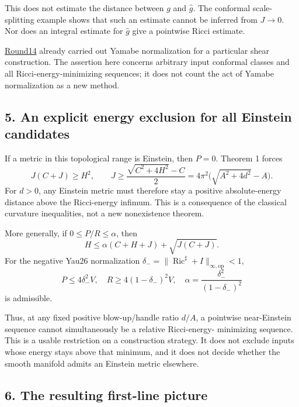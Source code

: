 \documentclass[
  11pt,
]{article}
\begin{document}
This does not estimate the distance between \(g\) and \(\widehat g\).
The conformal scale-splitting example shows that such an estimate cannot
be inferred from \(J\to0\). Nor does an integral estimate for
\(\widehat g\) give a pointwise Ricci estimate.

\href{round14_global.md}{Round14} already carried out Yamabe
normalization for a particular shear construction. The assertion here
concerns arbitrary input conformal classes and all
Ricci-energy-minimizing sequences; it does not count the act of Yamabe
normalization as a new method.

\hypertarget{an-explicit-energy-exclusion-for-all-einstein-candidates}{%
\subsection{5. An explicit energy exclusion for all Einstein
candidates}\label{an-explicit-energy-exclusion-for-all-einstein-candidates}}

If a metric in this topological range is Einstein, then \(P=0\). Theorem
1 forces \[
 J(C+J)\ge H^2,\qquad
 \boxed{
 J\ge\frac{\sqrt{C^2+4H^2}-C}{2}
   =4\pi^2\bigl(\sqrt{A^2+4d^2}-A\bigr).}
 \tag{30}
\] For \(d>0\), any Einstein metric must therefore stay a positive
absolute-energy distance above the Ricci-energy infimum. This is a
consequence of the classical curvature inequalities, not a new
nonexistence theorem.

More generally, if \(0\le P/R\le\alpha\), then \[
 H\le\alpha(C+H+J)+\sqrt{J(C+J)}.
 \tag{31}
\] For the negative Yau26 normalization
\(\delta_-=\|\operatorname{Ric}^{\sharp}+I\|_{\infty,\mathrm{op}}<1\),
\[
 P\le4\delta_-^2V,\quad R\ge4(1-\delta_-)^2V,\quad
 \alpha=\frac{\delta_-^2}{(1-\delta_-)^2}
 \tag{32}
\] is admissible.

Thus, at any fixed positive blow-up/handle ratio \(d/A\), a pointwise
near-Einstein sequence cannot simultaneously be a relative Ricci-energy-
minimizing sequence. This is a usable restriction on a construction
strategy. It does not exclude inputs whose energy stays above that
minimum, and it does not decide whether the smooth manifold admits an
Einstein metric elsewhere.

\hypertarget{the-resulting-first-line-picture}{%
\subsection{6. The resulting first-line
picture}\label{the-resulting-first-line-picture}}
\end{document}
